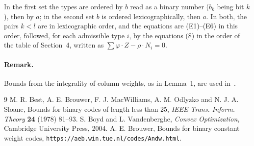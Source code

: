 \documentclass[11pt,a4paper]{article}
\begin{document}
In the first set the types are ordered by $b$ read as a binary number
($b_k$ being bit $k$), then by $a$; in the second set $b$ is ordered
lexicographically, then $a$. In both, the pairs $k<l$ are in lexicographic
order, and the equations are (E1)--(E6) in this order, followed, for each
admissible type $i$, by the equations (8) in the order of the table of
Section~4, written as $\sum\varphi\cdot Z-\rho\cdot N_i=0$.

\paragraph{Remark.}
Bounds from the integrality of column weights, as in Lemma~1, are used
in~\cite[Theorem 17]{BBMOS}.

\begin{thebibliography}{9}\small
{} M. R. Best, A. E. Brouwer, F. J. MacWilliams, A. M. Odlyzko
and N. J. A. Sloane, Bounds for binary codes of length less than 25,
\emph{IEEE Trans. Inform. Theory} \textbf{24} (1978) 81--93.
 S. Boyd and L. Vandenberghe, \emph{Convex Optimization},
Cambridge University Press, 2004.
 A. E. Brouwer, Bounds for binary constant weight codes,
\texttt{https://aeb.win.tue.nl/codes/Andw.html}.
\end{thebibliography}
\end{document}
